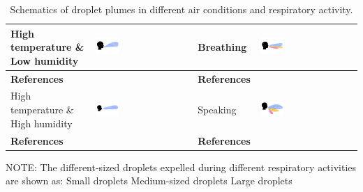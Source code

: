 \documentclass[a4paper,12pt]{elsarticle}
\DeclareRobustCommand{\legendsquare}[1]{%
  \tikz[baseline=(a.south)]{\node[#1, inner sep=.8ex, outer sep=0] (a) {};}%
  }
\begin{document}
\begin{table}[h!]
\begin{tabular}{|m{2.5cm}|m{4cm}||m{2.5cm}|m{4cm}|}
    \hline
    High temperature \& Low humidity & \includegraphics[clip,trim={0 2cm 0 2cm},width=0.25\textwidth]{Droplets/dropmat3.jpeg}& Breathing & \includegraphics[clip,trim={0 2cm 0 2cm},width=0.25\textwidth]{Droplets/dropmat7.jpeg} \\
    \hline
    \textbf{References} & \cite{zhang2019distribution,feng2020study,sen2021transmission} & \textbf{References} & \cite{he2011cfd,villafruela2019assessment,duill2021impact,shao2021risk,luo2022role,wang2022evaluation,wei2023effects} \\
    \hline
   High temperature \& High humidity & \includegraphics[clip,trim={0 2cm 0 2cm},width=0.25\textwidth]{Droplets/dropmat4.jpeg}& Speaking & \includegraphics[clip,trim={0 2cm 0 2cm},width=0.25\textwidth]{Droplets/dropmat8.jpeg} \\
    \hline
    \textbf{References} & \cite{zhang2019distribution,chong2021extended} & \textbf{References} & \cite{vuorinen2020modelling,zhou2021experimental,wang2022evaluation,wei2023effects} \\
    \hline
    \end{tabular}
    \caption{Schematics of droplet plumes in different air conditions and respiratory activity.}
    \label{tab:mat2}
    NOTE:  The different-sized droplets expelled during different respiratory activities are shown as: \legendsquare{fill=resp} Small droplets \legendsquare{fill=vent} Medium-sized droplets \legendsquare{fill=therm} Large droplets 
\end{table}
\end{document}
